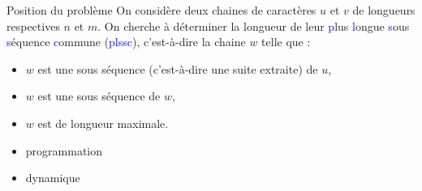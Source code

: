 \documentclass[10pt]{beamer}
\begin{document}
\begin{frame}{\Ctitle}{\stitle}
	\begin{exampleblock}{Position du problème}
		On considère deux chaines de caractères $u$ et $v$ de longueurs respectives $n$ et $m$. On cherche à déterminer la longueur de leur \textcolor{blue}{p}lus \textcolor{blue}{l}ongue \textcolor{blue}{s}ous \textcolor{blue}{s}équence \textcolor{blue}{c}ommune (\textcolor{blue}{\sc plssc}), c'est-à-dire la chaine $w$ telle que :
		\begin{itemize}
			\item<2-> $w$ est une sous séquence (c'est-à-dire une suite extraite) de $u$,
			\item<3-> $w$ est une sous séquence de $w$,
			\item<4-> $w$ est de longueur maximale.
		\end{itemize}
		\begin{itemize}
			\item<6-> {\sc progr\textcolor{BrickRed}{a}m\textcolor{BrickRed}{m}at\textcolor{BrickRed}{i}on}
			\item<7-> {\sc dyn\textcolor{BrickRed}{ami}que}
		\end{itemize}
	\end{exampleblock}
\end{frame}
\end{document}
